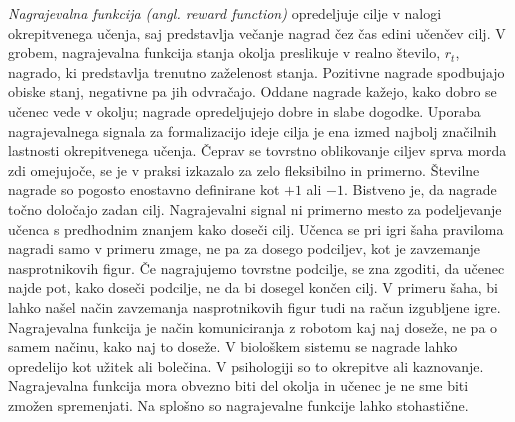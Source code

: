 \documentclass[a4paper, oneside, 12pt]{report}
\begin{document}
{\em Nagrajevalna funkcija (angl. reward function)} opredeljuje cilje v nalogi okrepitvenega učenja, saj predstavlja večanje nagrad čez čas edini učenčev cilj. V grobem, nagrajevalna funkcija stanja okolja preslikuje v realno število, $r_t$, nagrado, ki predstavlja trenutno zaželenost stanja. Pozitivne nagrade spodbujajo obiske stanj, negativne pa jih odvračajo. Oddane nagrade kažejo, kako dobro se učenec vede v okolju; nagrade opredeljujejo dobre in slabe dogodke. Uporaba nagrajevalnega signala za formalizacijo ideje cilja je ena izmed najbolj značilnih lastnosti okrepitvenega učenja. Čeprav se tovrstno oblikovanje ciljev sprva morda zdi omejujoče, se je v praksi izkazalo za zelo fleksibilno in primerno. Številne nagrade so pogosto enostavno definirane kot $+1$ ali $-1$. Bistveno je, da nagrade točno določajo zadan cilj. Nagrajevalni signal ni primerno mesto za podeljevanje učenca s predhodnim znanjem kako doseči cilj. Učenca se pri igri šaha praviloma nagradi samo v primeru zmage, ne pa za dosego podciljev, kot je zavzemanje nasprotnikovih figur. Če nagrajujemo tovrstne podcilje, se zna zgoditi, da učenec najde pot, kako doseči podcilje, ne da bi dosegel končen cilj. V primeru šaha, bi lahko našel način zavzemanja nasprotnikovih figur tudi na račun izgubljene igre. Nagrajevalna funkcija je način komuniciranja z robotom kaj naj doseže, ne pa o samem načinu, kako naj to doseže. V biološkem sistemu se nagrade lahko opredelijo kot užitek ali bolečina. V psihologiji so to okrepitve ali kaznovanje. Nagrajevalna funkcija mora obvezno biti del okolja in učenec je ne sme biti zmožen spremenjati. Na splošno so nagrajevalne funkcije lahko stohastične.
\end{document}
